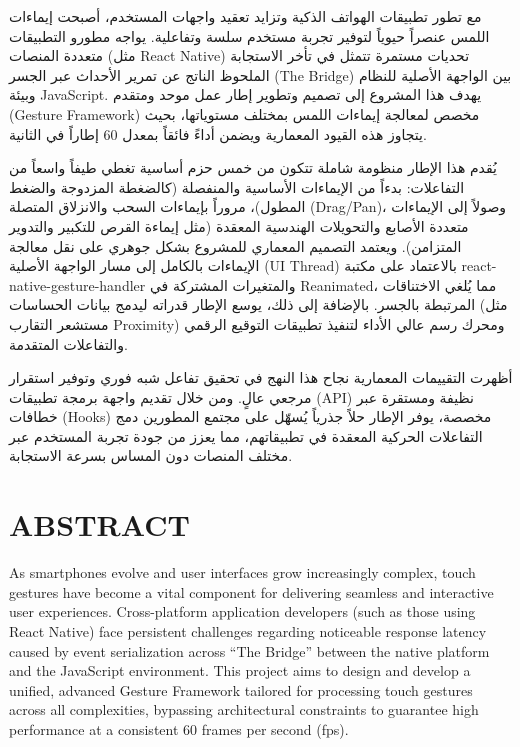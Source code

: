 \documentclass[12pt,a4paper]{report}
\begin{document}
\begin{Arabic}
\begingroup
\fontsize{11pt}{13.2pt}\selectfont
مع تطور تطبيقات الهواتف الذكية وتزايد تعقيد واجهات المستخدم، أصبحت إيماءات اللمس عنصراً حيوياً لتوفير تجربة مستخدم سلسة وتفاعلية. يواجه مطورو التطبيقات متعددة المنصات (مثل \textenglish{React Native}) تحديات مستمرة تتمثل في تأخر الاستجابة الملحوظ الناتج عن تمرير الأحداث عبر الجسر (\textenglish{The Bridge}) بين الواجهة الأصلية للنظام وبيئة \textenglish{JavaScript}. يهدف هذا المشروع إلى تصميم وتطوير إطار عمل موحد ومتقدم (\textenglish{Gesture Framework}) مخصص لمعالجة إيماءات اللمس بمختلف مستوياتها، بحيث يتجاوز هذه القيود المعمارية ويضمن أداءً فائقاً بمعدل 60 إطاراً في الثانية.

يُقدم هذا الإطار منظومة شاملة تتكون من خمس حزم أساسية تغطي طيفاً واسعاً من التفاعلات: بدءاً من الإيماءات الأساسية والمنفصلة (كالضغطة المزدوجة والضغط المطول)، مروراً بإيماءات السحب والانزلاق المتصلة (\textenglish{Drag/Pan})، وصولاً إلى الإيماءات متعددة الأصابع والتحويلات الهندسية المعقدة (مثل إيماءة القرص للتكبير والتدوير المتزامن). ويعتمد التصميم المعماري للمشروع بشكل جوهري على نقل معالجة الإيماءات بالكامل إلى مسار الواجهة الأصلية (\textenglish{UI Thread}) بالاعتماد على مكتبة \textenglish{react-native-gesture-handler} والمتغيرات المشتركة في \textenglish{Reanimated}، مما يُلغي الاختناقات المرتبطة بالجسر. بالإضافة إلى ذلك، يوسع الإطار قدراته ليدمج بيانات الحساسات (مثل مستشعر التقارب \textenglish{Proximity}) ومحرك رسم عالي الأداء لتنفيذ تطبيقات التوقيع الرقمي والتفاعلات المتقدمة.

أظهرت التقييمات المعمارية نجاح هذا النهج في تحقيق تفاعل شبه فوري وتوفير استقرار مرجعي عالٍ. ومن خلال تقديم واجهة برمجة تطبيقات (\textenglish{API}) نظيفة ومستقرة عبر خطافات (\textenglish{Hooks}) مخصصة، يوفر الإطار حلاً جذرياً يُسهّل على مجتمع المطورين دمج التفاعلات الحركية المعقدة في تطبيقاتهم، مما يعزز من جودة تجربة المستخدم عبر مختلف المنصات دون المساس بسرعة الاستجابة.
\par\endgroup
\end{Arabic}


\chapter*{ABSTRACT}

\begingroup
\fontsize{11pt}{13.2pt}\selectfont
As smartphones evolve and user interfaces grow increasingly complex, touch gestures have become a vital component for delivering seamless and interactive user experiences. Cross-platform application developers (such as those using React Native) face persistent challenges regarding noticeable response latency caused by event serialization across ``The Bridge'' between the native platform and the JavaScript environment. This project aims to design and develop a unified, advanced Gesture Framework tailored for processing touch gestures across all complexities, bypassing architectural constraints to guarantee high performance at a consistent 60 frames per second (fps).
\end{document}
